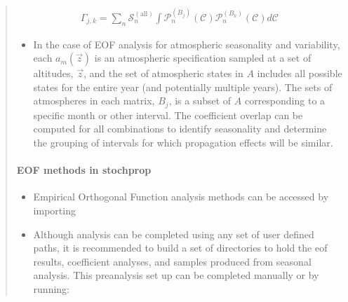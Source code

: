 \documentclass[letterpaper,10pt,english]{sphinxmanual}
\begin{document}
\begin{itemize}
\begin{quote}
\begin{itemize}
\end{itemize}
\begin{equation*}
\begin{split}\Gamma_{j,k}  =  \sum_n{ \mathcal{S}_n^{(\text{all})} \int{\mathcal{P}_n^{(B_j)} \left( \mathcal{C} \right) \mathcal{P}_n^{(B_k)} \left( \mathcal{C} \right) d \mathcal{C} }}\end{split}
\end{equation*}\begin{itemize}
\item {} 
In the case of EOF analysis for atmospheric seasonality and variability, each \(a_m(\vec{z})\) is an atmospheric specification sampled at a set of altitudes, \(\vec{z}\), and the set of atmospheric states in \(A\) includes all possible states for the entire year (and potentially multiple years).  The sets of atmospheres in each matrix, \(B_j\), is a subset of \(A\) corresponding to a specific month or other interval.  The coefficient overlap can be computed for all combinations to identify seasonality and determine the grouping of intervals for which propagation effects will be similar.

\end{itemize}


\paragraph{EOF methods in stochprop}
\label{\detokenize{eofs:eof-methods-in-stochprop}}\begin{itemize}
\item {} 
Empirical Orthogonal Function analysis methods can be accessed by importing 

\item {} 
Although analysis can be completed using any set of user defined paths, it is recommended to build a set of directories to hold the eof results, coefficient analyses, and samples produced from seasonal analysis.  This pre\sphinxhyphen{}analysis set up can be completed manually or by running:

\end{itemize}

\begin{sphinxVerbatim}[commandchars=\\\{\}]
 
 
   

   


\end{sphinxVerbatim}
\end{quote}
\end{itemize}
\end{document}
